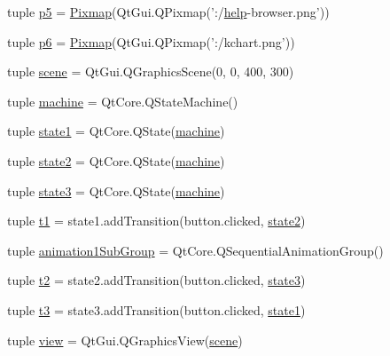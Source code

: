 \begin{DoxyCompactItemize}
tuple \hyperlink{namespacestates_a13a93410c33d08164a73183010d5cd56}{p5} = \hyperlink{classstates_1_1Pixmap}{Pixmap}(Qt\+Gui.\+Q\+Pixmap('\+:/\hyperlink{eepromer_8c_a0bed8474bd33a912769360766f6b10d4}{help}-\/browser.\+png'))
\item 
tuple \hyperlink{namespacestates_aec211bdb12ccd4197e5570600270d829}{p6} = \hyperlink{classstates_1_1Pixmap}{Pixmap}(Qt\+Gui.\+Q\+Pixmap('\+:/kchart.\+png'))
\item 
tuple \hyperlink{namespacestates_a5b980a981bd9d978c035fbbab0e3beed}{scene} = Qt\+Gui.\+Q\+Graphics\+Scene(0, 0, 400, 300)
\item 
tuple \hyperlink{namespacestates_aa350e8361ac007a1609c03c4b9ec0b45}{machine} = Qt\+Core.\+Q\+State\+Machine()
\item 
tuple \hyperlink{namespacestates_a8210003d0784e45c463be73e1174d89a}{state1} = Qt\+Core.\+Q\+State(\hyperlink{namespacestates_aa350e8361ac007a1609c03c4b9ec0b45}{machine})
\item 
tuple \hyperlink{namespacestates_a2f20091b29dcab9a757818992956f2e5}{state2} = Qt\+Core.\+Q\+State(\hyperlink{namespacestates_aa350e8361ac007a1609c03c4b9ec0b45}{machine})
\item 
tuple \hyperlink{namespacestates_af32fad31f58f469eb279d68d90683e60}{state3} = Qt\+Core.\+Q\+State(\hyperlink{namespacestates_aa350e8361ac007a1609c03c4b9ec0b45}{machine})
\item 
tuple \hyperlink{namespacestates_a5f7cdd68e40ef59dae4cee25a2e92c5c}{t1} = state1.\+add\+Transition(button.\+clicked, \hyperlink{namespacestates_a2f20091b29dcab9a757818992956f2e5}{state2})
\item 
tuple \hyperlink{namespacestates_ace63a368aac03494c93e2f796541bb0a}{animation1\+Sub\+Group} = Qt\+Core.\+Q\+Sequential\+Animation\+Group()
\item 
tuple \hyperlink{namespacestates_a006db3d3bf69e10a3bebfdfb5b6602b8}{t2} = state2.\+add\+Transition(button.\+clicked, \hyperlink{namespacestates_af32fad31f58f469eb279d68d90683e60}{state3})
\item 
tuple \hyperlink{namespacestates_ad429a6e4ea7d6eb7bb05fa58f4280596}{t3} = state3.\+add\+Transition(button.\+clicked, \hyperlink{namespacestates_a8210003d0784e45c463be73e1174d89a}{state1})
\item 
tuple \hyperlink{namespacestates_aa8f89fa91e0a40d52c2ac2a157394224}{view} = Qt\+Gui.\+Q\+Graphics\+View(\hyperlink{namespacestates_a5b980a981bd9d978c035fbbab0e3beed}{scene})
\end{DoxyCompactItemize}


